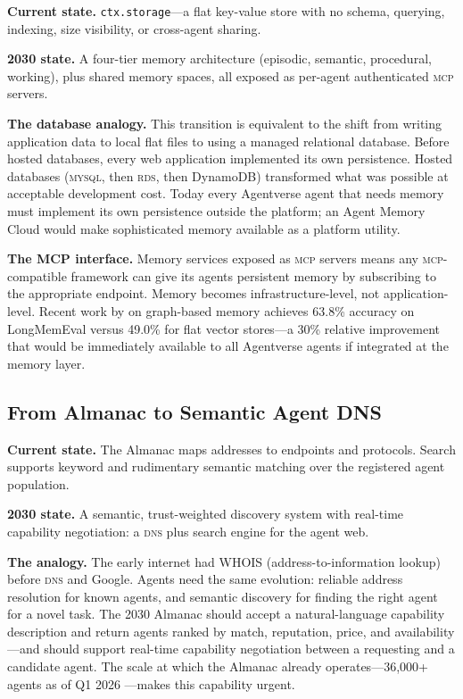 \documentclass[twoside,11pt]{article}
\begin{document}
\textbf{Current state.} \texttt{ctx.storage}---a flat key-value store with no
schema, querying, indexing, size visibility, or cross-agent sharing.

\textbf{2030 state.} A four-tier memory architecture (episodic, semantic,
procedural, working), plus shared memory spaces, all exposed as per-agent
authenticated \textsc{mcp} servers.

\textbf{The database analogy.} This transition is equivalent to the shift from
writing application data to local flat files to using a managed relational
database.  Before hosted databases, every web application implemented its own
persistence.  Hosted databases (\textsc{mysql}, then \textsc{rds}, then
DynamoDB) transformed what was possible at acceptable development cost.  Today
every Agentverse agent that needs memory must implement its own persistence
outside the platform; an Agent Memory Cloud would make sophisticated memory
available as a platform utility.

\textbf{The MCP interface.} Memory services exposed as \textsc{mcp} servers
means any \textsc{mcp}-compatible framework can give its agents persistent
memory by subscribing to the appropriate endpoint.  Memory becomes
infrastructure-level, not application-level.  Recent work by
\citet{zepgraphiti2025} on graph-based memory achieves 63.8\% accuracy on
LongMemEval versus 49.0\% for flat vector stores---a 30\% relative
improvement that would be immediately available to all Agentverse agents if
integrated at the memory layer.

\subsection{From Almanac to Semantic Agent DNS}
\label{subsec:path-dns}

\textbf{Current state.} The Almanac maps addresses to endpoints and protocols.
Search supports keyword and rudimentary semantic matching over the registered
agent population.

\textbf{2030 state.} A semantic, trust-weighted discovery system with real-time
capability negotiation: a \textsc{dns} plus search engine for the agent web.

\textbf{The analogy.} The early internet had WHOIS (address-to-information
lookup) before \textsc{dns} and Google.  Agents need the same evolution:
reliable address resolution for known agents, and semantic discovery for
finding the right agent for a novel task.  The 2030 Almanac should accept a
natural-language capability description and return agents ranked by match,
reputation, price, and availability---and should support real-time capability
negotiation between a requesting and a candidate agent.  The scale at which the
Almanac already operates---36,000+ agents as of Q1 2026
\citep{kantor2026stateofagents}---makes this capability urgent.
\end{document}
